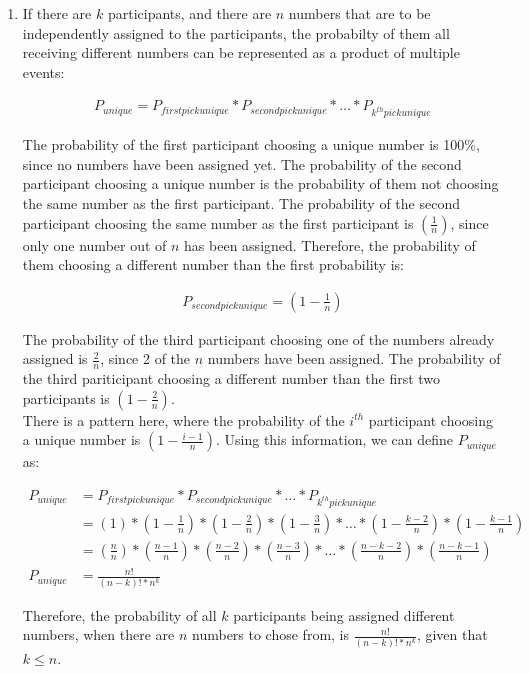 \documentclass[11pt]{article}
\theoremstyle{definition}
\begin{document}
\begin{enumerate}
\begin{enumerate}
\item If there are $k$ participants, and there are $n$ numbers that are to be independently assigned to the participants, the probabilty of them all receiving different numbers
can be represented as a product of multiple events:

\begin{align*}
P_{unique} = P_{first pick unique} * P_{second pick unique} * \ldots * P_{k^{th} pick unique}
\end{align*}

The probability of the first participant choosing a unique number is 100\%, since no numbers have been assigned yet. The probability of the second participant choosing a unique
number is the probability of them not choosing the same number as the first participant. The probability of the second participant choosing the same number as the first participant
is $( \frac{1}{n})$, since only one number out of $n$ has been assigned. Therefore, the probability of them choosing a different number than the first probability is:

\begin{align*}
P_{second pick unique} = (1 - \frac{1}{n})
\end{align*}

The probability of the third participant choosing one of the numbers already assigned is $\frac{2}{n}$, since 2 of the $n$ numbers have been assigned. The probability of the third pariticipant
choosing a different number than the first two participants is $(1 - \frac{2}{n})$.\\

There is a pattern here, where the probability of the $i^{th}$ participant choosing a unique number is $(1 - \frac{i-1}{n})$. Using this information, we can define $P_{unique}$ as:

\begin{align*}
P_{unique} &= P_{first pick unique} * P_{second pick unique} * \ldots * P_{k^{th} pick unique} \\ 
&= (1) * (1 - \frac{1}{n}) * (1 - \frac{2}{n}) * (1 - \frac{3}{n}) * \ldots * (1 - \frac{k - 2}{n}) * (1 - \frac{k - 1}{n})\\
&= (\frac{n}{n}) * (\frac{n - 1}{n}) * (\frac{n - 2}{n}) * (\frac{n - 3}{n}) * \ldots * (\frac{n - k - 2}{n}) * (\frac{n - k - 1}{n})\\
P_{unique} &= \frac{n!}{(n - k)! * n^k}
\end{align*}

Therefore, the probability of all $k$ participants being assigned different numbers, when there are $n$ numbers to chose from, is $\frac{n!}{(n - k)! * n^k}$, given that $k \leq n$.


\end{enumerate}
\end{enumerate}
\end{document}

